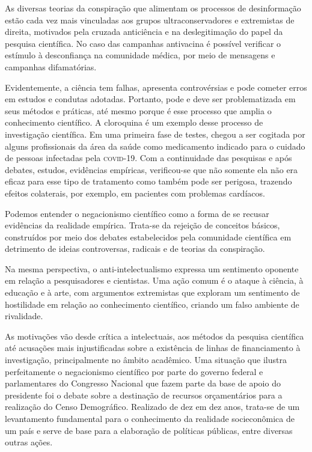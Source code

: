 As diversas teorias da conspiração que alimentam os processos de
desinformação estão cada vez mais vinculadas aos grupos
ultraconservadores e extremistas de direita, motivados pela cruzada
anticiência e na deslegitimação do papel da pesquisa científica. No caso
das campanhas antivacina é possível verificar o estímulo à desconfiança
na comunidade médica, por meio de mensagens e campanhas difamatórias.

Evidentemente, a ciência tem falhas, apresenta controvérsias e pode
cometer erros em estudos e condutas adotadas. Portanto, pode e deve ser
problematizada em seus métodos e práticas, até mesmo porque é esse
processo que amplia o conhecimento científico. A cloroquina é um exemplo
desse processo de investigação científica. Em uma primeira fase de
testes, chegou a ser cogitada por alguns profissionais da área da saúde
como medicamento indicado para o cuidado de pessoas infectadas pela
\textsc{covid-19}. Com a continuidade das pesquisas e após debates, estudos,
evidências empíricas, verificou-se que não somente ela não era eficaz
para esse tipo de tratamento como também pode ser perigosa, trazendo
efeitos colaterais, por exemplo, em pacientes com problemas cardíacos.

Podemos entender o negacionismo científico como a forma de se recusar
evidências da realidade empírica. Trata-se da rejeição de conceitos
básicos, construídos por meio dos debates estabelecidos pela comunidade
científica em detrimento de ideias controversas, radicais e de teorias
da conspiração.

Na mesma perspectiva, o anti-intelectualismo expressa um sentimento
oponente em relação a pesquisadores e cientistas. Uma ação comum é o
ataque à ciência, à educação e à arte, com argumentos extremistas que
exploram um sentimento de hostilidade em relação ao conhecimento
científico, criando um falso ambiente de rivalidade.

As motivações vão desde crítica a intelectuais, aos métodos da pesquisa
científica até acusações mais injustificadas sobre a existência de
linhas de financiamento à investigação, principalmente no âmbito
acadêmico. Uma situação que ilustra perfeitamente o negacionismo
científico por parte do governo federal e parlamentares do Congresso
Nacional que fazem parte da base de apoio do presidente foi o debate
sobre a destinação de recursos orçamentários para a realização do Censo
Demográfico. Realizado de dez em dez anos, trata-se de um levantamento
fundamental para o conhecimento da realidade socieconômica de um país e
serve de base para a elaboração de políticas públicas, entre diversas
outras ações.

